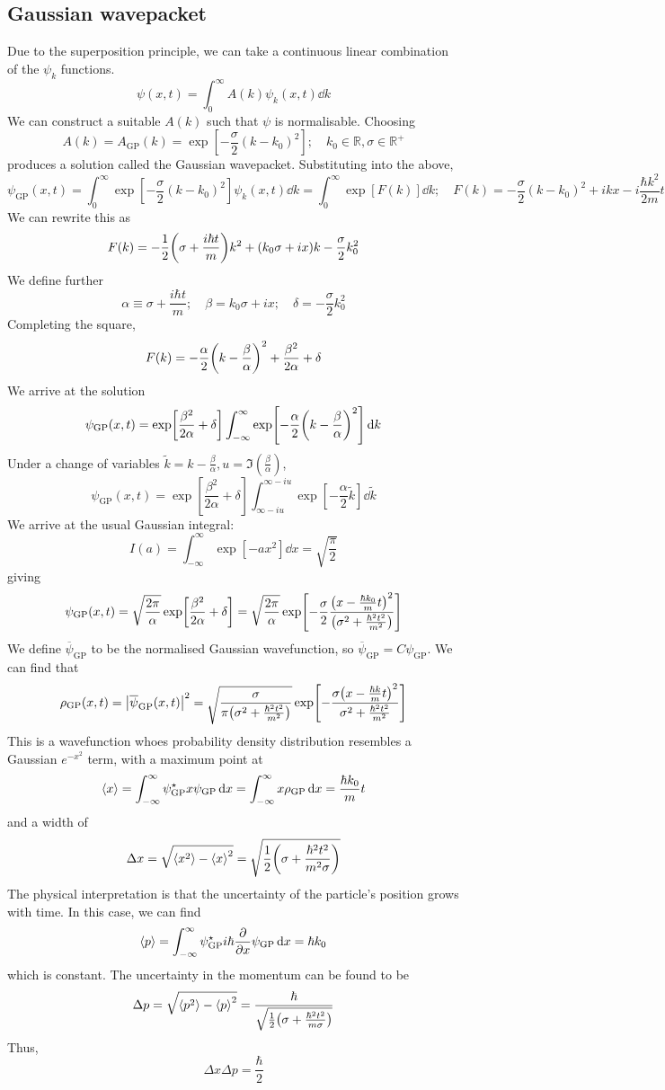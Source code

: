 \subsection{Gaussian wavepacket}
Due to the superposition principle, we can take a continuous linear combination of the \( \psi_k \) functions.
\[ \psi(x,t) = \int_0^\infty A(k) \psi_k(x,t) \dd{k} \]
We can construct a suitable \( A(k) \) such that \( \psi \) is normalisable.
Choosing
\[ A(k) = A_{\text{GP}}(k) = \exp[-\frac{\sigma}{2}(k-k_0)^2];\quad k_0 \in \mathbb R, \sigma \in \mathbb R^+ \]
produces a solution called the Gaussian wavepacket.
Substituting into the above,
\[ \psi_{\text{GP}}(x,t) = \int_0^\infty \exp[-\frac{\sigma}{2}(k-k_0)^2] \psi_k(x,t) \dd{k} = \int_0^\infty \exp[F(k)] \dd{k};\quad F(k) = -\frac{\sigma}{2}(k-k_0)^2 + ikx - i \frac{\hbar k^2}{2m} t \]
We can rewrite this as
\[ F(k) = -\frac{1}{2}\qty(\sigma + \frac{i \hbar t}{m}) k^2 + (k_0 \sigma + ix)k - \frac{\sigma}{2} k_0^2 \]
We define further
\[ \alpha \equiv \sigma + \frac{i \hbar t}{m};\quad \beta = k_0 \sigma + ix;\quad \delta = -\frac{\sigma}{2} k_0^2 \]
Completing the square,
\[ F(k) = -\frac{\alpha}{2} \qty(k - \frac{\beta}{\alpha})^2 + \frac{\beta^2}{2\alpha} + \delta \]
We arrive at the solution
\[ \psi_{\text{GP}}(x,t) = \exp[\frac{\beta^2}{2\alpha} + \delta] \int_{-\infty}^\infty \exp[-\frac{\alpha}{2}\qty(k - \frac{\beta}{\alpha})^2 ] \dd{k} \]
Under a change of variables \( \widetilde k = k - \frac{\beta}{\alpha}, u = \Im(\frac{\beta}{\alpha}) \),
\[ \psi_{\text{GP}}(x,t) = \exp[\frac{\beta^2}{2\alpha} + \delta] \int_{\infty - iu}^{\infty - iu} \exp[-\frac{\alpha}{2} \widetilde k] \dd{\widetilde k} \]
We arrive at the usual Gaussian integral:
\[ I(a) = \int_{-\infty}^\infty \exp[-a x^2] \dd{x} = \sqrt{\frac{\pi}{2}} \]
giving
\[ \psi_{\text{GP}}(x,t) = \sqrt{\frac{2 \pi}{\alpha}} \exp[\frac{\beta^2}{2\alpha} + \delta] = \sqrt{\frac{2\pi}{\alpha}} \exp[-\frac{\sigma}{2} \frac{\qty(x - \frac{\hbar k_0}{m} t)^2}{\qty(\sigma^2 + \frac{\hbar^2 t^2}{m^2} )} ] \]
We define \( \overline \psi_{\text{GP}} \) to be the normalised Gaussian wavefunction, so \( \overline \psi_{\text{GP}} = C \psi_{\text{GP}} \).
We can find that
\[ \rho_{\text{GP}}(x,t) = \abs{\overline \psi_{\text{GP}}(x,t)}^2 = \sqrt{\frac{\sigma}{\pi \qty(\sigma^2 + \frac{\hbar^2 t^2}{m^2})}} \exp[ - \frac{\sigma\qty(x - \frac{\hbar k}{m} t)^2}{\sigma^2 + \frac{\hbar^2 t^2}{m^2}} ] \]
This is a wavefunction whoes probability density distribution resembles a Gaussian \( e^{-x^2} \) term, with a maximum point at
\[ \left\langle{x}\right\rangle = \int_{-\infty}^\infty \psi_{\text{GP}}^\star x \psi_{\text{GP}} \dd{x} = \int_{-\infty}^\infty x \rho_{\text{GP}} \dd{x} = \frac{\hbar k_0}{m} t \]
and a width of
\[ \Delta x = \sqrt{\left\langle{x^2}\right\rangle - \left\langle{x}\right\rangle^2} = \sqrt{\frac{1}{2} \qty(\sigma + \frac{\hbar^2 t^2}{m^2 \sigma})} \]
The physical interpretation is that the uncertainty of the particle's position grows with time.
In this case, we can find
\[ \left\langle{p}\right\rangle = \int_{-\infty}^\infty \psi_{\text{GP}}^\star i \hbar \pdv{x} \psi_{\text{GP}} \dd{x} = \hbar k_0 \]
which is constant.
The uncertainty in the momentum can be found to be
\[ \Delta p = \sqrt{\left\langle{p^2}\right\rangle - \left\langle{p}\right\rangle^2} = \frac{\hbar}{\sqrt{\frac{1}{2} \qty(\sigma + \frac{\hbar^2 t^2}{m \sigma})}} \]
Thus,
\[ \Delta x \Delta p = \frac{\hbar}{2} \]
